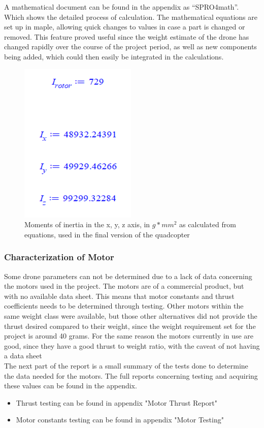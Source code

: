 A mathematical document can be found in the appendix as “SPRO4math”. Which shows the detailed process of calculation. The mathematical equations are set up in maple, allowing quick changes to values in case a part is changed or removed. This feature proved useful since the weight estimate of the drone has changed rapidly over the course of the project period, as well as new components being added, which could then easily be integrated in the calculations.

\begin{figure}[H]
\begin{center}
   \includegraphics[scale =1]{pictures/control/Inertia moments.png}
\end{center}
\caption{Moments of inertia in the x, y, z axis, in $g*mm^2$ as calculated from equations, used in the final version of the quadcopter}
\end{figure}

\subsubsection{Characterization of Motor}
Some drone parameters can not be determined due to a lack of data concerning the motors used in the project. The motors are of a commercial product, but with no available data sheet. This means that motor constants and thrust coefficients needs to be determined through testing. Other motors within the same weight class were available, but those other alternatives did not provide the thrust desired compared to their weight, since the weight requirement set for the project is around 40 grams. For the same reason the motors currently in use are good, since they have a good thrust to weight ratio, with the caveat of not having a data sheet\\
The next part of the report is a small summary of the tests done to determine the data needed for the motors. The full reports concerning testing and acquiring these values can be found in the appendix. 
\begin{itemize}
    \item Thrust testing can be found in appendix "Motor Thrust Report"
    \item Motor constants testing can be found in appendix "Motor Testing"
\end{itemize}

